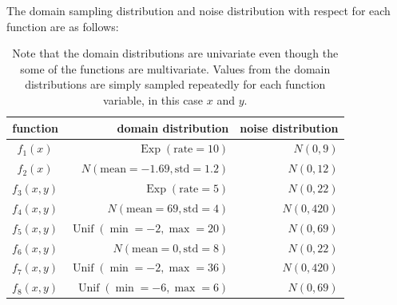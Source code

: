\documentclass[12pt]{article}
\begin{document}
        The domain sampling distribution and noise distribution with respect for each function are as follows:
        \begin{table}[H]
            \centering
            \caption{Note that the domain distributions are univariate even though the some of the functions are multivariate. Values from the domain distributions are simply sampled repeatedly for each function variable, in this case $x$ and $y$.}
            \begin{tabular}{crr}
                \toprule
                function & domain distribution & noise distribution \\
                \midrule
                $f_1(x)$ & $\operatorname{Exp}(\text{rate}=10)$    & $N(0,9)$  \\
                $f_2(x)$ & $N(\text{mean}=-1.69, \text{std}=1.2)$    & $N(0,12)$  \\
                $f_3(x,y)$ & $\operatorname{Exp}(\text{rate}=5)$    & $N(0,22)$  \\
                $f_4(x,y)$ & $N(\text{mean}=69, \text{std}=4)$      & $N(0,420)$ \\
                $f_5(x,y)$ & $\operatorname{Unif}(\min=-2,\max=20)$ & $N(0,69)$  \\
                $f_6(x,y)$ & $N(\text{mean}=0, \text{std}=8)$       & $N(0,22)$  \\
                $f_7(x,y)$ & $\operatorname{Unif}(\min=-2,\max=36)$    & $N(0,420)$ \\
                $f_8(x,y)$ & $\operatorname{Unif}(\min=-6,\max=6)$  & $N(0,69)$  \\
                \bottomrule
            \end{tabular}
        \end{table}
\end{document}
